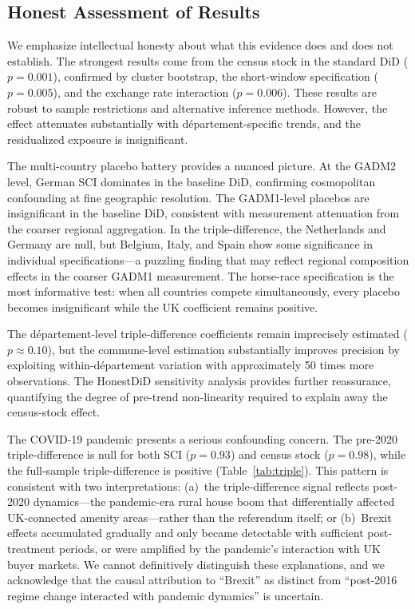 \documentclass[12pt]{article}
\begin{document}
\subsection{Honest Assessment of Results}

We emphasize intellectual honesty about what this evidence does and does not establish. The strongest results come from the census stock in the standard DiD ($p = 0.001$), confirmed by cluster bootstrap, the short-window specification ($p = 0.005$), and the exchange rate interaction ($p = 0.006$). These results are robust to sample restrictions and alternative inference methods. However, the effect attenuates substantially with d\'epartement-specific trends, and the residualized exposure is insignificant.

The multi-country placebo battery provides a nuanced picture. At the GADM2 level, German SCI dominates in the baseline DiD, confirming cosmopolitan confounding at fine geographic resolution. The GADM1-level placebos are insignificant in the baseline DiD, consistent with measurement attenuation from the coarser regional aggregation. In the triple-difference, the Netherlands and Germany are null, but Belgium, Italy, and Spain show some significance in individual specifications---a puzzling finding that may reflect regional composition effects in the coarser GADM1 measurement. The horse-race specification is the most informative test: when all countries compete simultaneously, every placebo becomes insignificant while the UK coefficient remains positive.

The d\'epartement-level triple-difference coefficients remain imprecisely estimated ($p \approx 0.10$), but the commune-level estimation substantially improves precision by exploiting within-d\'epartement variation with approximately 50 times more observations. The HonestDiD sensitivity analysis provides further reassurance, quantifying the degree of pre-trend non-linearity required to explain away the census-stock effect.

The COVID-19 pandemic presents a serious confounding concern. The pre-2020 triple-difference is null for both SCI ($p = 0.93$) and census stock ($p = 0.98$), while the full-sample triple-difference is positive (Table~\ref{tab:triple}). This pattern is consistent with two interpretations: (a)~the triple-difference signal reflects post-2020 dynamics---the pandemic-era rural house boom that differentially affected UK-connected amenity areas---rather than the referendum itself; or (b)~Brexit effects accumulated gradually and only became detectable with sufficient post-treatment periods, or were amplified by the pandemic's interaction with UK buyer markets. We cannot definitively distinguish these explanations, and we acknowledge that the causal attribution to ``Brexit'' as distinct from ``post-2016 regime change interacted with pandemic dynamics'' is uncertain.
\end{document}
